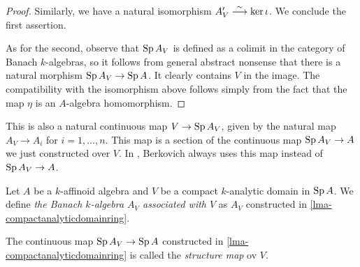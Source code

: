\begin{proof}
    Similarly, we have a natural isomorphism $A_V'\stackrel{\sim}{\longrightarrow} \ker \iota$. We conclude the first assertion.

    As for the second, observe that $\operatorname{Sp} A_V$ is defined as a colimit in the category of Banach $k$-algebras, so it follows from general abstract nonsense that there is a natural morphism $\operatorname{Sp} A_V\rightarrow \operatorname{Sp} A$. It clearly contains $V$ in the image. The compatibility with the isomorphism above follows simply from the fact that the map $\eta$ is an $A$-algebra homomorphism.
\end{proof}

\begin{remark}
    This is also a natural continuous map $V\rightarrow \operatorname{Sp} A_V$, given by the natural map $A_V\rightarrow A_i$ for $i=1,\ldots,n$. This map is a section of the continuous map $\operatorname{Sp} A_V\rightarrow A$ we just constructed over $V$. In \cite{Berk93}, Berkovich always uses this map instead of  $\operatorname{Sp} A_V\rightarrow A$. 
\end{remark}


\begin{definition}
    Let $A$ be a $k$-affinoid algebra and $V$ be a compact $k$-analytic domain in $\operatorname{Sp} A$. We define \emph{the Banach $k$-algebra $A_V$ associated with $V$} as $A_V$ constructed in \cref{lma-compactanalyticdomainring}.

    The continuous map $\operatorname{Sp} A_V\rightarrow \operatorname{Sp} A$ constructed in  \cref{lma-compactanalyticdomainring} is called the \emph{structure map} ov $V$.
\end{definition}


